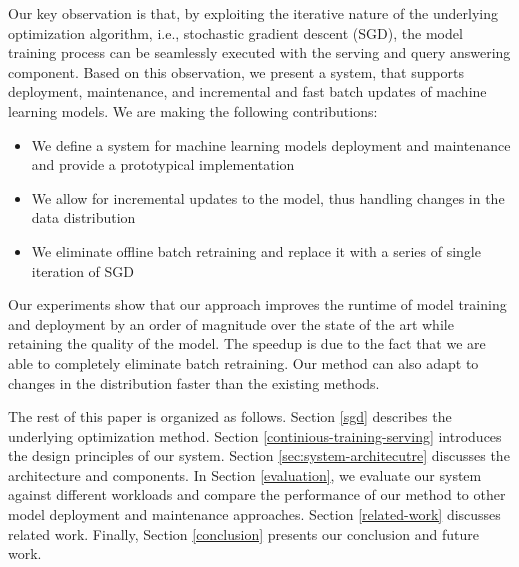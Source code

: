 \documentclass{vldb}
\begin{document}
Our key observation is that, by exploiting the iterative nature of the underlying optimization algorithm, i.e., stochastic gradient descent (SGD), the model training process can be seamlessly executed with the serving and query answering component.
Based on this observation, we present a system, that supports deployment, maintenance, and incremental and fast batch updates of machine learning models.
We are making the following contributions: 
\begin{itemize}
\item We define a system for machine learning models deployment and maintenance and provide a prototypical implementation
\item We allow for incremental updates to the model, thus handling changes in the data distribution
\item We eliminate offline batch retraining and replace it with a series of single iteration of SGD
\end{itemize}
Our experiments show that our approach improves the runtime of model training and deployment by an order of magnitude over the state of the art while retaining the quality of the model. 
The speedup is due to the fact that we are able to completely eliminate batch retraining. 
Our method can also adapt to changes in the distribution faster than the existing methods.

The rest of this paper is organized as follows. 
Section \ref{sgd} describes the underlying optimization method.
Section \ref{continious-training-serving} introduces the design principles of our system. 
Section \ref{sec:system-architecutre} discusses the architecture and components.
In Section \ref{evaluation}, we evaluate our system against different workloads and compare the performance of our method to other model deployment and maintenance approaches. 
Section \ref {related-work} discusses related work.
Finally, Section \ref{conclusion} presents our conclusion and future work.
\end{document}
